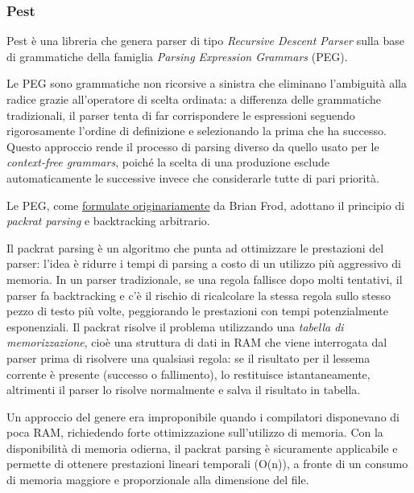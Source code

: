 \documentclass{article}
\begin{document}
    \subsubsection{Pest}

    Pest è una libreria che genera parser di tipo \textit{Recursive Descent Parser} sulla base di grammatiche della famiglia \textit{Parsing Expression Grammars} (PEG).

    Le PEG sono grammatiche non ricorsive a sinistra che eliminano l'ambiguità alla radice grazie all'operatore di scelta ordinata: a differenza delle grammatiche tradizionali, il parser tenta di far corrispondere le espressioni seguendo rigorosamente l'ordine di definizione e selezionando la prima che ha successo. Questo approccio rende il processo di parsing diverso da quello usato per le \textit{context-free grammars}, poiché la scelta di una produzione esclude automaticamente le successive invece che considerarle tutte di pari priorità.

    Le PEG, come \href{https://pdos.csail.mit.edu/~baford/packrat/thesis/thesis.pdf}{formulate originariamente} da Brian Frod, adottano il principio di \textit{packrat parsing} e backtracking arbitrario.

    Il packrat parsing è un algoritmo che punta ad ottimizzare le prestazioni del parser: l'idea è ridurre i tempi di parsing a costo di un utilizzo più aggressivo di memoria.
    In un parser tradizionale, se una regola fallisce dopo molti tentativi, il parser fa backtracking e c'è il rischio di ricalcolare la stessa regola sullo stesso pezzo di testo più volte, peggiorando le prestazioni con tempi potenzialmente esponenziali. Il packrat risolve il problema utilizzando una \textit{tabella di memorizzazione}, cioè una struttura di dati in RAM che viene interrogata dal parser prima di risolvere una qualsiasi regola: se il risultato per il lessema corrente è presente (successo o fallimento), lo restituisce istantaneamente, altrimenti il parser lo risolve normalmente e salva il risultato in tabella.

    Un approccio del genere era improponibile quando i compilatori disponevano di poca RAM, richiedendo forte ottimizzazione sull'utilizzo di memoria.
    Con la disponibilità di memoria odierna, il packrat parsing è sicuramente applicabile e permette di ottenere prestazioni lineari temporali (O(n)), a fronte di un consumo di memoria maggiore e proporzionale alla dimensione del file.
\end{document}
